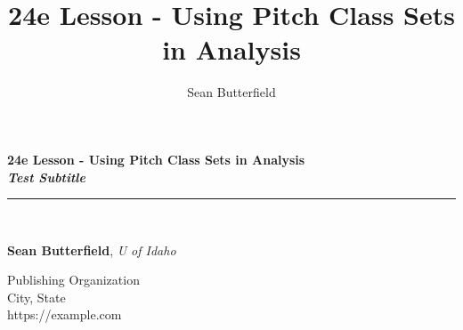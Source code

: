 \documentclass{book}
\title{24e Lesson - Using Pitch Class Sets in Analysis}
\author{Sean Butterfield}
\begin{document}
\frontmatter

\begin{titlepage}
\begin{flushleft}

\textbf{\fontsize{48}{54}\selectfont 24e Lesson - Using Pitch Class Sets in
Analysis \\}
\textbf{\large \textit{Test Subtitle}}

\par\noindent\rule{\textwidth}{4pt}\\

\begin{flushright}

      \textbf{Sean Butterfield}, \emph{U of Idaho}\\
  
\end{flushright}

\vspace{\fill}

\end{flushleft}

\begin{center}
  \small{Publishing Organization\\
  City, State\\
  https://example.com}
\end{center}
  
\end{titlepage}
\restoregeometry

\thispagestyle{empty}
\end{document}
